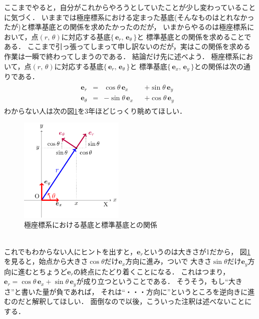 ここまでやると，自分がこれからやろうとしていたことが少し変わっていることに気づく．
いままでは極座標系における定まった基底(そんなものはとれなかったが)と標準基底との関係を求めたかったのだが，
いまからやるのは極座標系において，点$(r, \, \theta)$に対応する基底$\{ \, \bm{e}_r, \, \bm{e}_\theta \, \} $と
標準基底との関係を求めることである．
ここまで引っ張ってしまって申し訳ないのだが，実はこの関係を求める作業は一瞬で終わってしまうのである．
結論だけ先に述べよう．
極座標系において，点$(r, \, \theta)$に対応する基底$\{ \, \bm{e}_r, \, \bm{e}_\theta \, \} $と
標準基底$\{ \, \bm{e}_x, \, \bm{e}_y \, \}$との関係は次の通りである．
\begin{align}
\begin{aligned}
\bm{e}_r& = & \cos \theta \, \bm{e}_x & & + \sin \theta \, \bm{e}_y & \\
\bm{e}_\theta & = &  - \sin \theta \, \bm{e}_x & & + \cos \theta \, \bm{e}_y &
\label{eq:kyokukiteihenkan}
\end{aligned}
\end{align}
わからない人は次の図\ref{fig:kyokukiteikankei}を3年ほどじっくり眺めてほしい．
\begin{figure}[h]
 \begin{center}
 \includegraphics[width=5cm]{picture/vecter14.pdf}
 \caption{極座標系における基底と標準基底との関係}
\label{fig:kyokukiteikankei}
 \end{center}
\end{figure}
\\
これでもわからない人にヒントを出すと，$\bm{e}_r$というのは大きさが1だから，
図\ref{fig:kyokukiteikankei}を見ると，始点から大きさ$\cos \theta$だけ$\bm{e}_x$方向に進み，ついで
大きさ$\sin \theta$だけ$\bm{e}_y$方向に進むとちょうど$\bm{e}_r$の終点にたどり着くことになる．
これはつまり，$\bm{e}_r=\cos \theta \, \bm{e}_x + \sin \theta \, \bm{e}_y$が成り立つということである．
そうそう，もし``大きさ''と書いた量が負であれば，
それは``・・・方向に''というところを逆向きに進むのだと解釈してほしい．
面倒なので以後，こういった注釈は述べないことにする．


